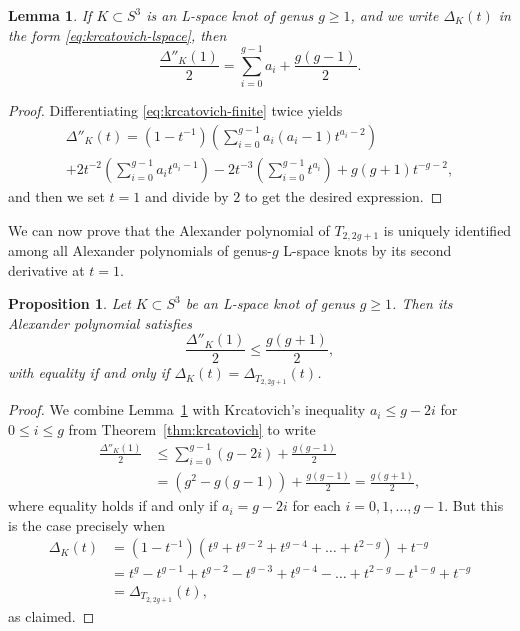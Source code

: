 \documentclass[11pt]{amsart}
\newtheorem {lemma}[theorem]{Lemma}
\newtheorem {proposition}[theorem]{Proposition}
\numberwithin{equation}{section}
\numberwithin{theorem}{section}
\theoremstyle{definition}
\begin{document}
\begin{lemma} \label{lem:lspace-casson}
If $K \subset S^3$ is an L-space knot of genus $g \geq 1$, and we write $\Delta_K(t)$ in the form \eqref{eq:krcatovich-lspace}, then
\[ \frac{\Delta''_K(1)}{2} = \sum_{i=0}^{g-1} a_i + \frac{g(g-1)}{2}. \]
\end{lemma}

\begin{proof}
Differentiating \eqref{eq:krcatovich-finite} twice yields
\begin{multline*}
\Delta''_K(t) = (1-t^{-1})\left(\sum_{i=0}^{g-1} a_i(a_i-1)t^{a_i-2}\right) \\
+ 2t^{-2}\left(\sum_{i=0}^{g-1} a_it^{a_i-1}\right) - 2t^{-3}\left(\sum_{i=0}^{g-1} t^{a_i}\right) + g(g+1)t^{-g-2},
\end{multline*}
and then we set $t=1$ and divide by $2$ to get the desired expression.
\end{proof}

We can now prove that the Alexander polynomial of $T_{2,2g+1}$ is uniquely identified among all Alexander polynomials of genus-$g$ L-space knots by its second derivative at $t=1$.

\begin{proposition} \label{prop:casson-t2n}
Let $K \subset S^3$ be an L-space knot of genus $g \geq 1$.  Then its Alexander polynomial satisfies
\[ \frac{\Delta''_K(1)}{2} \leq \frac{g(g+1)}{2}, \]
with equality if and only if $\Delta_K(t) = \Delta_{T_{2,2g+1}}(t)$.
\end{proposition}

\begin{proof}
We combine Lemma~\ref{lem:lspace-casson} with Krcatovich's inequality $a_i \leq g - 2i$ for $0 \leq i \leq g$ from Theorem~\ref{thm:krcatovich} to write
\begin{align*}
\frac{\Delta''_K(1)}{2} &\leq \sum_{i=0}^{g-1} (g-2i) + \frac{g(g-1)}{2} \\
&= \left(g^2 - g(g-1)\right) + \frac{g(g-1)}{2} = \frac{g(g+1)}{2},
\end{align*}
where equality holds if and only if $a_i = g-2i$ for each $i=0,1,\dots,g-1$.  But this is the case precisely when
\begin{align*}
\Delta_K(t) &= (1-t^{-1})(t^g + t^{g-2} + t^{g-4} + \dots + t^{2-g}) + t^{-g} \\
&= t^g - t^{g-1} + t^{g-2} - t^{g-3} + t^{g-4} - \dots + t^{2-g} - t^{1-g} + t^{-g} \\
&= \Delta_{T_{2,2g+1}}(t),
\end{align*}
as claimed.
\end{proof}
\end{document}
